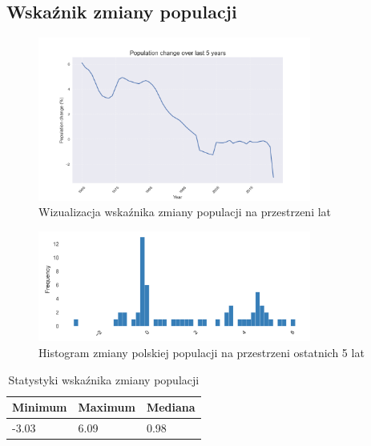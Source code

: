 \documentclass[11pt]{article}
\begin{document}
\subsection{Wskaźnik zmiany populacji}
\begin{figure}[H]
        \centering
        \includegraphics[width=0.8\textwidth]{polish_pop_change_5_years.png}
        \caption{Wizualizacja wskaźnika zmiany populacji na przestrzeni lat}
\end{figure}
\begin{figure}[H]
        \centering
        \includegraphics[width=0.8\textwidth]{images/histogram_zmiana_populacji.png}
        \caption{Histogram zmiany polskiej populacji na przestrzeni ostatnich 5 lat}
\end{figure}
\begin{table}[H]
        \centering
        \begin{tabular}{|l|l|l|}
        \hline
        Minimum & Maximum & Mediana \\ \hline
        -3.03 & 6.09 & 0.98 \\ \hline
        \end{tabular}
        \caption{Statystyki wskaźnika zmiany populacji}
        \end{table}
\end{document}
